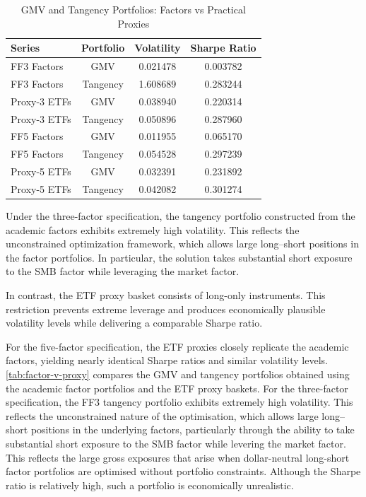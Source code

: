 \documentclass[11pt]{exam}
\begin{document}
\begin{table}[h!]
\centering
\caption{GMV and Tangency Portfolios: Factors vs Practical Proxies}
\label{tab:proxy_results}
\begin{tabular}{lccc}
\hline
Series & Portfolio & Volatility & Sharpe Ratio \\
\hline
FF3 Factors & GMV & 0.021478 & 0.003782 \\
FF3 Factors & Tangency & 1.608689 & 0.283244 \\
Proxy-3 ETFs & GMV & 0.038940 & 0.220314 \\
Proxy-3 ETFs & Tangency & 0.050896 & 0.287960 \\
FF5 Factors & GMV & 0.011955 & 0.065170 \\
FF5 Factors & Tangency & 0.054528 & 0.297239 \\
Proxy-5 ETFs & GMV & 0.032391 & 0.231892 \\
Proxy-5 ETFs & Tangency & 0.042082 & 0.301274 \\
\hline
\end{tabular}
\end{table}
Under the three-factor specification, the tangency portfolio constructed from the academic factors exhibits extremely high volatility. This reflects the unconstrained optimization framework, which allows large long–short positions in the factor portfolios. In particular, the solution takes substantial short exposure to the SMB factor while leveraging the market factor.

In contrast, the ETF proxy basket consists of long-only instruments. This restriction prevents extreme leverage and produces economically plausible volatility levels while delivering a comparable Sharpe ratio.

For the five-factor specification, the ETF proxies closely replicate the academic factors, yielding nearly identical Sharpe ratios and similar volatility levels.
\noindent
\autoref{tab:factor-v-proxy} compares the GMV and tangency portfolios obtained using the academic factor portfolios and the ETF proxy baskets. For the three-factor specification, the FF3 tangency portfolio exhibits extremely high volatility. This reflects the unconstrained nature of the optimisation, which allows large long–short positions in the underlying factors, particularly through the ability to take substantial short exposure to the SMB factor while levering the market factor. This reflects the large gross exposures that arise when dollar-neutral long-short factor portfolios are optimised without portfolio constraints. Although the Sharpe ratio is relatively high, such a portfolio is economically unrealistic.
\end{document}
